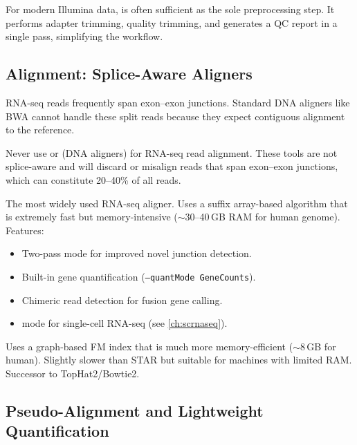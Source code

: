 \begin{tipbox}
For modern Illumina data,  is often sufficient as the sole
preprocessing step. It performs adapter trimming, quality trimming, and
generates a QC report in a single pass, simplifying the workflow.
\end{tipbox}

\subsection{Alignment: Splice-Aware Aligners}

RNA-seq reads frequently span exon--exon junctions. Standard DNA aligners like
BWA cannot handle these split reads because they expect contiguous alignment
to the reference.

\begin{warningbox}
Never use  or  (DNA aligners) for RNA-seq
read alignment. These tools are not splice-aware and will discard or misalign
reads that span exon--exon junctions, which can constitute 20--40\% of all
reads.
\end{warningbox}

\begin{description}[style=nextline]
  \item[\software{STAR} (Spliced Transcripts Alignment to a Reference)]
    The most widely used RNA-seq aligner. Uses a suffix array-based algorithm
    that is extremely fast but memory-intensive ($\sim$30--40\,GB RAM for
    human genome). Features:
    \begin{itemize}[nosep]
      \item Two-pass mode for improved novel junction detection.
      \item Built-in gene quantification (\texttt{--quantMode GeneCounts}).
      \item Chimeric read detection for fusion gene calling.
      \item {} mode for single-cell RNA-seq (see \cref{ch:scrnaseq}).
    \end{itemize}
  \item[\software{HISAT2} (Hierarchical Indexing for Spliced Alignment of Transcripts)]
    Uses a graph-based FM index that is much more memory-efficient ($\sim$8\,GB
    for human). Slightly slower than STAR but suitable for machines with limited
    RAM. Successor to TopHat2/Bowtie2.
\end{description}

\subsection{Pseudo-Alignment and Lightweight Quantification}

